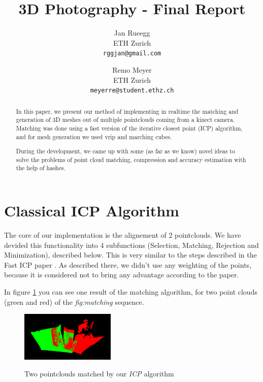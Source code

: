 \documentclass[10pt,twocolumn,letterpaper]{article}
\begin{document}
\title{3D Photography - Final Report}

\author{Jan Rueegg\\
ETH Zurich\\
{\tt\small rggjan@gmail.com}
\and
Remo Meyer\\
ETH Zurich\\
{\tt\small meyerre@student.ethz.ch}
}

\maketitle
\thispagestyle{empty}

\begin{abstract}
In this paper, we present our method of implementing in realtime the matching and generation of 3D meshes out of multiple pointclouds coming from a kinect
camera. Matching was done using a fast version of the iterative closest point (ICP) algorithm, and for mesh generation we used vrip and marching cubes.

During the development, we came up with some (as far as we know) novel ideas to solve the problems of point cloud matching, compression and accuracy
estimation with the help of hashes.
\end{abstract}

\section{Classical ICP Algorithm}
The core of our implementation is the alignement of 2 pointclouds. 
We have devided this functionality into 4 subfunctions (Selection, Matching, Rejection and Minimization), described below. This is very
similar to the steps described in the Fast ICP paper \cite{fasticp}. As described there, we didn't use any weighting of the points,
because it is considered not to bring any advantage according to the paper.

In figure \ref{fig:matching} you can see one result of the matching algorithm, for two point clouds (green and red) of the \textit{fig:matching} sequence.

\begin{figure}
  \centering
  \includegraphics[width=0.4\textwidth]{matching}
  \label{fig:matching}
  \caption{Two pointclouds matched by our \textit{ICP} algorithm}
\end{figure}
\end{document}
